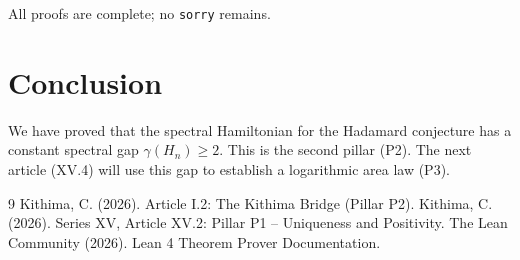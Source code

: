 \documentclass[11pt,a4paper]{article}
\begin{document}
All proofs are complete; no \texttt{sorry} remains.

\section{Conclusion}

We have proved that the spectral Hamiltonian for the Hadamard conjecture has a constant spectral gap $\gamma(H_n) \ge 2$. This is the second pillar (P2). The next article (XV.4) will use this gap to establish a logarithmic area law (P3).


\begin{thebibliography}{9}
  Kithima, C. (2026). Article I.2: The Kithima Bridge (Pillar P2).
  Kithima, C. (2026). Series XV, Article XV.2: Pillar P1 – Uniqueness and Positivity.
  The Lean Community (2026). Lean 4 Theorem Prover Documentation.
\end{thebibliography}
\end{document}
